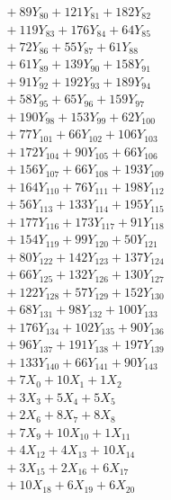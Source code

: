\documentclass[a4paper,10pt]{article}
\begin{document}
{\begin{align}
&\;  + 89 Y_{80} + 121 Y_{81} + 182 Y_{82} \\[0.3ex]
&\;  + 119 Y_{83} + 176 Y_{84} + 64 Y_{85} \\[0.3ex]
&\;  + 72 Y_{86} + 55 Y_{87} + 61 Y_{88} \\[0.5ex]\allowbreak
&\;  + 61 Y_{89} + 139 Y_{90} + 158 Y_{91} \\[0.3ex]
&\;  + 91 Y_{92} + 192 Y_{93} + 189 Y_{94} \\[0.3ex]
&\;  + 58 Y_{95} + 65 Y_{96} + 159 Y_{97} \\[0.3ex]
&\;  + 190 Y_{98} + 153 Y_{99} + 62 Y_{100} \\[0.3ex]
&\;  + 77 Y_{101} + 66 Y_{102} + 106 Y_{103} \\[0.3ex]
&\;  + 172 Y_{104} + 90 Y_{105} + 66 Y_{106} \\[0.3ex]
&\;  + 156 Y_{107} + 66 Y_{108} + 193 Y_{109} \\[0.3ex]
&\;  + 164 Y_{110} + 76 Y_{111} + 198 Y_{112} \\[0.3ex]
&\;  + 56 Y_{113} + 133 Y_{114} + 195 Y_{115} \\[0.3ex]
&\;  + 177 Y_{116} + 173 Y_{117} + 91 Y_{118} \\[0.5ex]\allowbreak
&\;  + 154 Y_{119} + 99 Y_{120} + 50 Y_{121} \\[0.3ex]
&\;  + 80 Y_{122} + 142 Y_{123} + 137 Y_{124} \\[0.3ex]
&\;  + 66 Y_{125} + 132 Y_{126} + 130 Y_{127} \\[0.3ex]
&\;  + 122 Y_{128} + 57 Y_{129} + 152 Y_{130} \\[0.3ex]
&\;  + 68 Y_{131} + 98 Y_{132} + 100 Y_{133} \\[0.3ex]
&\;  + 176 Y_{134} + 102 Y_{135} + 90 Y_{136} \\[0.3ex]
&\;  + 96 Y_{137} + 191 Y_{138} + 197 Y_{139} \\[0.3ex]
&\;  + 133 Y_{140} + 66 Y_{141} + 90 Y_{143} \\[0.3ex]
&\;  + 7 X_{0} + 10 X_{1} + 1 X_{2} \\[0.3ex]
&\;  + 3 X_{3} + 5 X_{4} + 5 X_{5} \\[0.5ex]\allowbreak
&\;  + 2 X_{6} + 8 X_{7} + 8 X_{8} \\[0.3ex]
&\;  + 7 X_{9} + 10 X_{10} + 1 X_{11} \\[0.3ex]
&\;  + 4 X_{12} + 4 X_{13} + 10 X_{14} \\[0.3ex]
&\;  + 3 X_{15} + 2 X_{16} + 6 X_{17} \\[0.3ex]
&\;  + 10 X_{18} + 6 X_{19} + 6 X_{20} \\[0.3ex]

\end{align}}
\end{document}
